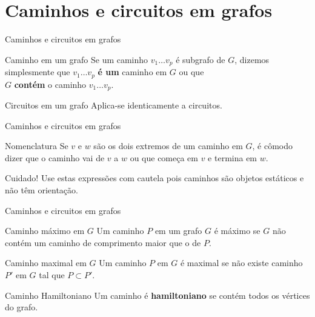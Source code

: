 \documentclass[xcolor=dvipsnames,table]{beamer}
\begin{document}
	\section{Caminhos e circuitos em grafos}
	\begin{frame}{Caminhos e circuitos em grafos}
		\begin{block}{Caminho em um grafo}
			Se um caminho $v_1 \ldots v_p$ é subgrafo de $G$, dizemos simplesmente que $v_1 \ldots v_p$ {\bf é um} caminho em $G$ ou que \\$G$ {\bf contém} o caminho $v_1 \ldots v_p$.
		\end{block} \pause
		\begin{exampleblock}{Circuitos em um grafo}
			Aplica-se identicamente a circuitos.
		\end{exampleblock} 
	\end{frame}
	
	\begin{frame}{Caminhos e circuitos em grafos}
		\begin{block}{Nomenclatura}
			Se $v$ e $w$ são os dois extremos de um caminho em $G$, é cômodo dizer que o caminho vai de $v$ a $w$ ou que começa em $v$ e termina em $w$.
		\end{block} \pause
		\begin{alertblock}{Cuidado!}
			Use estas expressões com cautela pois caminhos são objetos estáticos e não têm orientação.
		\end{alertblock}
	\end{frame}
	
	\begin{frame}{Caminhos e circuitos em grafos}
		\begin{block}{Caminho máximo em $G$}
			Um caminho $P$ em um grafo $G$ é máximo se $G$ não contém um caminho de comprimento maior que o de $P$.
		\end{block} \pause
		\begin{block}{Caminho maximal em $G$}
			Um caminho $P$ em $G$ é maximal se não existe caminho $P'$ em $G$ tal que $P \subset P'$.
		\end{block} \pause
		\begin{block}{Caminho Hamiltoniano}
			Um caminho é {\bf hamiltoniano} se contém todos os vértices do grafo.
		\end{block}
	\end{frame}	
	
\end{document}
